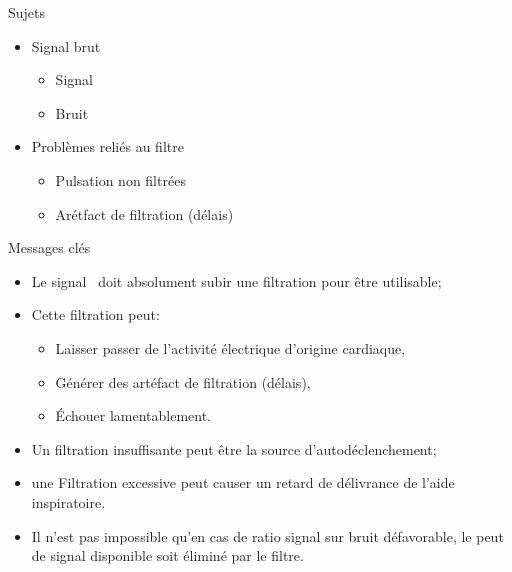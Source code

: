 \begin{frame}{Sujets}
	\begin{itemize}
		\item Signal \emgdi brut
			\begin{itemize}
				\item Signal
				\item Bruit
			\end{itemize}
		\item Problèmes reliés au filtre
			\begin{itemize}
				\item Pulsation non filtrées
				\item Arétfact de filtration (délais)
			\end{itemize}
	\end{itemize}
\end{frame}

\begin{frame}{Messages clés}
	\begin{itemize}
		\item Le signal \emgdi\ doit absolument subir une filtration pour
			être utilisable;
		\item Cette filtration peut:
			\begin{itemize}
				\item Laisser passer de l'activité électrique d'origine cardiaque,
				\item Générer des artéfact de filtration (délais),
					\item Échouer lamentablement.
			\end{itemize}
		\item Un filtration insuffisante peut être la source
			d'autodéclenchement;
		\item une Filtration excessive peut causer un retard de délivrance
			de l'aide inspiratoire.
			\item Il n'est pas impossible qu'en cas de ratio signal sur bruit
			défavorable, le peut de signal disponible soit éliminé par le
			filtre.
	\end{itemize}
\end{frame}
